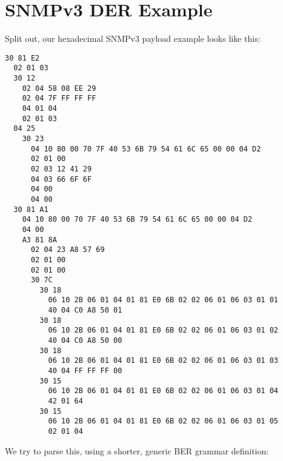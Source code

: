 \newpage
\section{SNMPv3 DER Example}

Split out, our hexadecimal SNMPv3 payload example looks like this:

\begin{changemargin}{-60mm}{0mm}
\begin{myquote}
\begin{verbatim}
30 81 E2
  02 01 03
  30 12
    02 04 58 08 EE 29
    02 04 7F FF FF FF
    04 01 04
    02 01 03
  04 25
    30 23
      04 10 80 00 70 7F 40 53 6B 79 54 61 6C 65 00 00 04 D2
      02 01 00
      02 03 12 41 29
      04 03 66 6F 6F
      04 00
      04 00
  30 81 A1
    04 10 80 00 70 7F 40 53 6B 79 54 61 6C 65 00 00 04 D2
    04 00
    A3 81 8A
      02 04 23 A8 57 69
      02 01 00
      02 01 00
      30 7C
        30 18
          06 10 2B 06 01 04 01 81 E0 6B 02 02 06 01 06 03 01 01
          40 04 C0 A8 50 01
        30 18
          06 10 2B 06 01 04 01 81 E0 6B 02 02 06 01 06 03 01 02
          40 04 C0 A8 50 00
        30 18
          06 10 2B 06 01 04 01 81 E0 6B 02 02 06 01 06 03 01 03
          40 04 FF FF FF 00
        30 15
          06 10 2B 06 01 04 01 81 E0 6B 02 02 06 01 06 03 01 04
          42 01 64
        30 15
          06 10 2B 06 01 04 01 81 E0 6B 02 02 06 01 06 03 01 05
          02 01 04
\end{verbatim}
\end{myquote}
\end{changemargin}

We try to parse this, using a shorter, generic BER grammar definition:

